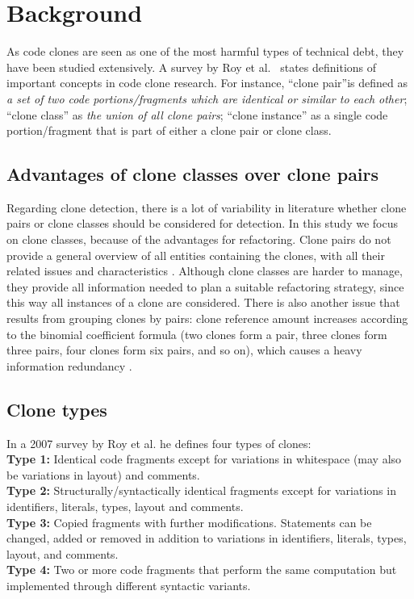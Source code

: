 \documentclass[a4paper]{article}
\begin{document}
\section{Background}\label{chap:background}
As code clones are seen as one of the most harmful types of technical debt, they have been studied extensively. A survey by Roy et al.~\cite{roy2007survey} states definitions of important concepts in code clone research. For instance, ``clone pair''is defined as \textit{a set of two code portions/fragments which are identical or similar to each other}; ``clone class'' as \textit{the union of all clone pairs}; ``clone instance'' as a single code portion/fragment that is part of either a clone pair or clone class.

\subsection{Advantages of clone classes over clone pairs}\label{chap:cloneclasses}
Regarding clone detection, there is a lot of variability in literature whether clone pairs or clone classes should be considered for detection. In this study we focus on clone classes, because of the advantages for refactoring. Clone pairs do not provide a general overview of all entities containing the clones, with all their related issues and characteristics \cite{fontana2012duplicated}. Although clone classes are harder to manage, they provide all information needed to plan a suitable refactoring strategy, since this way all instances of a clone are considered. There is also another issue that results from grouping clones by pairs: clone reference amount increases according to the binomial coefficient formula (two clones form a pair, three clones form three pairs, four clones form six pairs, and so on), which causes a heavy information redundancy \cite{fontana2012duplicated}.

\subsection{Clone types}\label{chap:backgroundclonetypes}
In a 2007 survey by Roy et al. \cite{roy2007survey} he defines four types of clones:\\
\textbf{Type 1:} Identical code fragments except for variations in whitespace (may also be variations in layout) and comments.\\
\textbf{Type 2:} Structurally/syntactically identical fragments except for variations in identifiers, literals, types, layout and comments.\\
\textbf{Type 3:} Copied fragments with further modifications. Statements can be changed, added or removed in addition to variations in identifiers, literals, types, layout, and comments.\\
\textbf{Type 4:} Two or more code fragments that perform the same computation but implemented through different syntactic variants.
\end{document}

